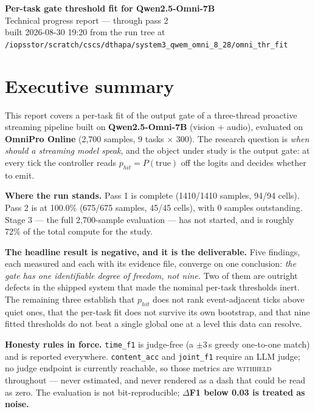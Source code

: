 \documentclass[11pt,a4paper]{article}
\newcommand{\WITHHELD}{\textsc{withheld}}
\begin{document}
\begin{center}{\LARGE\bfseries Per-task gate threshold fit for Qwen2.5-Omni-7B}\\[2mm]{\large Technical progress report --- through pass 2}\\[3mm]{\small built 2026-08-30 19:20 from the run tree at\\\texttt{/iopsstor/scratch/cscs/dthapa/system3\_qwem\_omni\_8\_28/omni\_thr\_fit}}\end{center}
\vspace{3mm}
\suppressfloats[t]

\section*{Executive summary}

This report covers a per-task fit of the output gate of a three-thread
proactive streaming pipeline built on \textbf{Qwen2.5-Omni-7B} (vision $+$ audio),
evaluated on \textbf{OmniPro Online} (2{,}700 samples, 9 tasks $\times$ 300).
The research question is \emph{when should a streaming model speak}, and the
object under study is the output gate: at every tick the controller reads
$p_\mathit{hit}=P(\text{true})$ off the logits and decides whether to emit.

\textbf{Where the run stands.} Pass 1 is complete (1410/1410 samples, 94/94 cells). Pass 2 is at 100.0\% (675/675 samples, 45/45 cells), with 0 samples outstanding. Stage 3 --- the full 2{,}700-sample evaluation --- has not started, and is roughly 72\% of the total compute for the study.

\textbf{The headline result is negative, and it is the deliverable.}
Five findings, each measured and each with its evidence file, converge on one
conclusion: \emph{the gate has one identifiable degree of freedom, not nine.}
Two of them are outright defects in the shipped system that made the nominal
per-task thresholds inert. The remaining three establish that $p_\mathit{hit}$
does not rank event-adjacent ticks above quiet ones, that the per-task fit does
not survive its own bootstrap, and that nine fitted thresholds do not beat a
single global one at a level this data can resolve.

\textbf{Honesty rules in force.} \texttt{time\_f1} is judge-free (a
$\pm3$\,s greedy one-to-one match) and is reported everywhere. \texttt{content\_acc}
and \texttt{joint\_f1} require an LLM judge; no judge endpoint is currently
reachable, so those metrics are \WITHHELD{} throughout --- never estimated, and
never rendered as a dash that could be read as zero. The evaluation is not
bit-reproducible; \textbf{$\Delta$F1 below 0.03 is treated as noise.}
\end{document}
